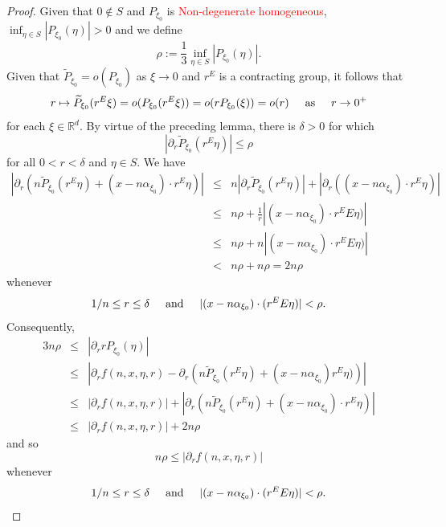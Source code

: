 \documentclass[11pt]{article}
\begin{document}
\begin{proof}
Given that $0\notin S$ and $P_{\xi_0}$ is \textcolor{red}{Non-degenerate homogeneous}, $\inf_{\eta\in S}|P_{\xi_0}(\eta)|>0$ and we define
\begin{equation*}
    \rho:=\frac{1}{3}\inf_{\eta\in S} |P_{\xi_0}(\eta)|.
\end{equation*}
Given that $\widetilde{P}_{\xi_0}=o(P_{\xi_0})$ as $\xi\to 0$ and $r^E$ is a contracting group, it follows that
\begin{equation*}
r\mapsto \widetilde{P}_{\xi_0}(r^E\xi)=o(P_{\xi_0}(r^E\xi))=o(rP_{\xi_0}(\xi))=o(r)\hspace{.5cm}\mbox{as}\hspace{.5cm}r\to 0^+
\end{equation*}
for each $\xi\in\mathbb{R}^d$. By virtue of the preceding lemma, there is $\delta>0$ for which
\begin{equation*}
    |\partial_r\widetilde{P}_{\xi_0}(r^E\eta)|\leq \rho
\end{equation*}
for all $0<r<\delta$ and $\eta\in S$. We have
\begin{eqnarray*}
\left|\partial_r
\left(
n\widetilde{P}_{\xi_0}
(r^E\eta)
+(x-n\alpha_{\xi_0})\cdot r^E\eta
\right)
\right|
&\leq &
n\left|
\partial_r\widetilde{P}_{\xi_0}(r^E\eta)
\right|
+\left|\partial_r\left((x-n\alpha_{\xi_0})\cdot r^E\eta\right)\right|\\
&\leq& n\rho+ \frac{1}{r}|(x-n\alpha_{\xi_0})\cdot r^E E\eta)|\\
&\leq& n\rho +n|(x-n\alpha_{\xi_0})\cdot r^E E\eta)|\\
&<& n\rho+n\rho=2n\rho
\end{eqnarray*}
whenever 
\begin{equation*}
   1/n\leq r\leq\delta\hspace{.5cm}\mbox{and}\hspace{.5cm}|(x-n\alpha_{\xi_0})\cdot(r^E E\eta)|<\rho. 
\end{equation*}
Consequently,
\begin{eqnarray*}
    3n\rho&\leq& |\partial_r rP_{\xi_0}(\eta)|\\
    &\leq& \left|\partial_rf(n,x,\eta,r)-\partial_r\left(n\widetilde{P}_{\xi_0}(r^E\eta)+(x-n\alpha_{\xi_0})r^E\eta)\right)\right|\\
    &\leq& \left|\partial_r f(n,x,\eta,r)\right|+\left|\partial_r
\left(
n\widetilde{P}_{\xi_0}
(r^E\eta)
+(x-n\alpha_{\xi_0})\cdot r^E\eta
\right)
\right|\\
&\leq &|\partial_r f(n,x,\eta,r)|+2n\rho
\end{eqnarray*}
and so
\begin{equation*}
    n\rho\leq |\partial_r f(n,x,\eta,r)|
\end{equation*}
whenever
\begin{equation*}
   1/n\leq r\leq\delta\hspace{.5cm}\mbox{and}\hspace{.5cm}|(x-n\alpha_{\xi_0})\cdot(r^E E\eta)|<\rho. 
\end{equation*}
\end{proof}
\end{document}
